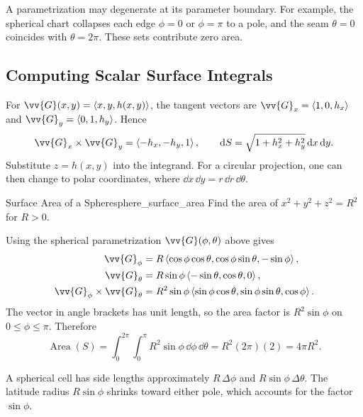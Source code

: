 A parametrization may degenerate at its parameter boundary. For example, the spherical chart collapses each edge $\phi = 0$ or $\phi = \pi$ to a pole, and the seam $\theta = 0$ coincides with $\theta = 2\pi$. These sets contribute zero area.

\newpage
\subsection{Computing Scalar Surface Integrals}

\begin{example}
For $\vv{G}(x,y) = \ang{x,y,h(x,y)}$, the tangent vectors are
$\vv{G}_x = \ang{1,0,h_x}$ and $\vv{G}_y = \ang{0,1,h_y}$. Hence
\[
    \vv{G}_x \times \vv{G}_y = \ang{-h_x,-h_y,1},\qquad
    \dd{S} = \sqrt{1 + h_x^2 + h_y^2}\,\dd{x}\,\dd{y}.
\]
Substitute $z = h(x,y)$ into the integrand. For a circular projection, one can then change to polar coordinates, where $\dd{x}\,\dd{y} = r\,\dd{r}\,\dd{\theta}$.
\end{example}

\begin{problem}{Surface Area of a Sphere}{sphere_surface_area}
Find the area of $x^2 + y^2 + z^2 = R^2$ for $R > 0$.
\end{problem}
\begin{sol}
Using the spherical parametrization $\vv{G}(\phi,\theta)$ above gives
\begin{align*}
    \vv{G}_{\phi} &= R\ang{\cos\phi\cos\theta,\cos\phi\sin\theta,-\sin\phi},\\
    \vv{G}_{\theta} &= R\sin\phi\ang{-\sin\theta,\cos\theta,0},\\
    \vv{G}_{\phi} \times \vv{G}_{\theta}
        &= R^2\sin\phi\ang{\sin\phi\cos\theta,\sin\phi\sin\theta,\cos\phi}.
\end{align*}
The vector in angle brackets has unit length, so the area factor is $R^2\sin\phi$ on $0 \le \phi \le \pi$. Therefore
\[
    \operatorname{Area}(S)
    = \int_0^{2\pi}\int_0^\pi R^2\sin\phi\,\dd{\phi}\,\dd{\theta}
    = R^2(2\pi)(2) = \boxed{4\pi R^2}.
\]
\end{sol}

A spherical cell has side lengths approximately $R\,\Delta\phi$ and $R\sin\phi\,\Delta\theta$. The latitude radius $R\sin\phi$ shrinks toward either pole, which accounts for the factor $\sin\phi$.

